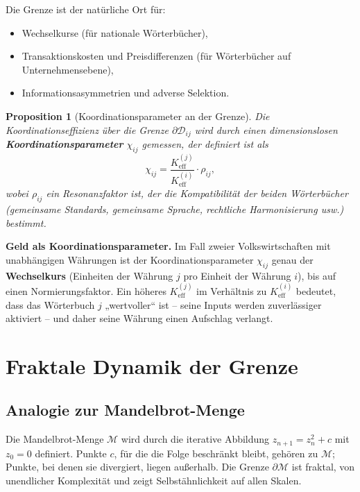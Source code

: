 \documentclass[12pt,a4paper]{article}
\newtheorem{proposition}[theorem]{Proposition}
\theoremstyle{remark}
\begin{document}
	Die Grenze ist der natürliche Ort für:
	\begin{itemize}
		\item Wechselkurse (für nationale Wörterbücher),
		\item Transaktionskosten und Preisdifferenzen (für Wörterbücher auf Unternehmensebene),
		\item Informationsasymmetrien und adverse Selektion.
	\end{itemize}
	
	\begin{proposition}[Koordinationsparameter an der Grenze]
		Die Koordinationseffizienz über die Grenze \(\partial\mathcal{D}_{ij}\) wird durch einen dimensionslosen \textbf{Koordinationsparameter} \(\chi_{ij}\) gemessen, der definiert ist als
		\begin{equation}
			\chi_{ij} = \frac{K_{\mathrm{eff}}^{(j)}}{K_{\mathrm{eff}}^{(i)}} \cdot \rho_{ij},
			\label{eq:chi}
		\end{equation}
		wobei \(\rho_{ij}\) ein Resonanzfaktor ist, der die Kompatibilität der beiden Wörterbücher (gemeinsame Standards, gemeinsame Sprache, rechtliche Harmonisierung usw.) bestimmt.
	\end{proposition}
	
	\textbf{Geld als Koordinationsparameter.} Im Fall zweier Volkswirtschaften mit unabhängigen Währungen ist der Koordinationsparameter \(\chi_{ij}\) genau der \textbf{Wechselkurs} (Einheiten der Währung \(j\) pro Einheit der Währung \(i\)), bis auf einen Normierungsfaktor. Ein höheres \(K_{\mathrm{eff}}^{(j)}\) im Verhältnis zu \(K_{\mathrm{eff}}^{(i)}\) bedeutet, dass das Wörterbuch \(j\) „wertvoller“ ist – seine Inputs werden zuverlässiger aktiviert – und daher seine Währung einen Aufschlag verlangt.
	
	\section{Fraktale Dynamik der Grenze}
	
	\subsection{Analogie zur Mandelbrot-Menge}
	
	Die Mandelbrot-Menge \(\mathcal{M}\) wird durch die iterative Abbildung \(z_{n+1} = z_n^2 + c\) mit \(z_0 = 0\) definiert. Punkte \(c\), für die die Folge beschränkt bleibt, gehören zu \(\mathcal{M}\); Punkte, bei denen sie divergiert, liegen außerhalb. Die Grenze \(\partial\mathcal{M}\) ist fraktal, von unendlicher Komplexität und zeigt Selbstähnlichkeit auf allen Skalen.
	
\end{document}
